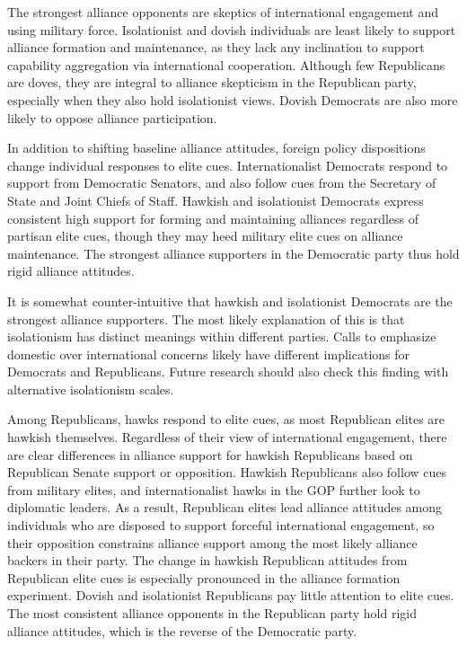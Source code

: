 \documentclass[12pt]{article}
\begin{document}
The strongest alliance opponents are skeptics of international engagement and using military force. 
Isolationist and dovish individuals are least likely to support alliance formation and maintenance, as they lack any inclination to support capability aggregation via international cooperation.
Although few Republicans are doves, they are integral to alliance skepticism in the Republican party, especially when they also hold isolationist views.
Dovish Democrats are also more likely to oppose alliance participation.  


In addition to shifting baseline alliance attitudes, foreign policy dispositions change individual responses to elite cues. 
Internationalist Democrats respond to support from Democratic Senators, and also follow cues from the Secretary of State and Joint Chiefs of Staff. 
Hawkish and isolationist Democrats express consistent high support for forming and maintaining alliances regardless of partisan elite cues, though they may heed military elite cues on alliance maintenance. 
The strongest alliance supporters in the Democratic party thus hold rigid alliance attitudes.


It is somewhat counter-intuitive that hawkish and isolationist Democrats are the strongest alliance supporters. 
The most likely explanation of this is that isolationism has distinct meanings within different parties.
Calls to emphasize domestic over international concerns likely have different implications for Democrats and Republicans.
Future research should also check this finding with alternative isolationism scales. 


Among Republicans, hawks respond to elite cues, as most Republican elites are hawkish themselves. 
Regardless of their view of international engagement, there are clear differences in alliance support for hawkish Republicans based on Republican Senate support or opposition.
Hawkish Republicans also follow cues from military elites, and internationalist hawks in the GOP further look to diplomatic leaders. 
As a result, Republican elites lead alliance attitudes among individuals who are disposed to support forceful international engagement, so their opposition constrains alliance support among the most likely alliance backers in their party. 
The change in hawkish Republican attitudes from Republican elite cues is especially pronounced in the alliance formation experiment. 
Dovish and isolationist Republicans pay little attention to elite cues. 
The most consistent alliance opponents in the Republican party hold rigid alliance attitudes, which is the reverse of the Democratic party. 
\end{document}
